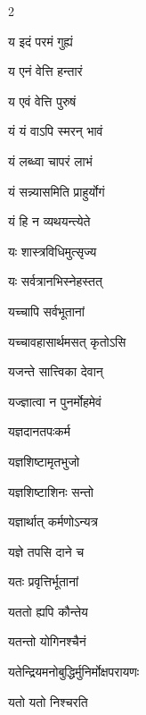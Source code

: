 \begin{multicols}{2}
\begin{indexlist}
\item य इदं परमं गुह्यं \dotfill {}
\item य एनं वेत्ति हन्तारं \dotfill {}
\item य एवं वेत्ति पुरुषं \dotfill {}
\item यं यं वाऽपि स्मरन् भावं \dotfill {}
\item यं लब्ध्वा चापरं लाभं \dotfill {}
\item यं सन्न्यासमिति प्राहुर्योगं \dotfill {}
\item यं हि न व्यथयन्त्येते \dotfill {}
\item यः शास्त्रविधिमुत्सृज्य \dotfill {}
\item यः सर्वत्रानभिस्नेहस्तत् \dotfill {}
\item यच्चापि सर्वभूतानां \dotfill {}
\item यच्चावहासार्थमसत् कृतोऽसि \dotfill {}
\item यजन्ते सात्त्विका देवान् \dotfill {}
\item यज्ज्ञात्वा न पुनर्मोहमेवं \dotfill {}
\item यज्ञदानतपःकर्म \dotfill {}
\item यज्ञशिष्टामृतभुजो \dotfill {}
\item यज्ञशिष्टाशिनः सन्तो \dotfill {}
\item यज्ञार्थात् कर्मणोऽन्यत्र \dotfill {}
\item यज्ञे तपसि दाने च \dotfill {}
\item यतः प्रवृत्तिर्भूतानां \dotfill {}
\item यततो ह्यपि कौन्तेय \dotfill {}
\item यतन्तो योगिनश्चैनं \dotfill {}
\item यतेन्द्रियमनोबुद्धिर्मुनिर्मोक्षपरायणः \dotfill {}
\item यतो यतो निश्चरति \dotfill {}

\end{indexlist}
\end{multicols}
